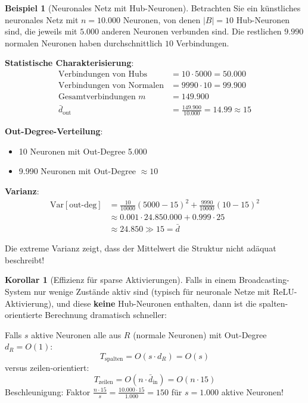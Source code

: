 \documentclass[a4paper,12pt]{report}
\theoremstyle{definition}
\newtheorem{beispiel}{Beispiel}
\newtheorem{korollar}{Korollar}
\begin{document}
	\begin{beispiel}[Neuronales Netz mit Hub-Neuronen]
		Betrachten Sie ein künstliches neuronales Netz mit $n = 10.000$ Neuronen, von denen $|B| = 10$ Hub-Neuronen sind, die jeweils mit $5.000$ anderen Neuronen verbunden sind. Die restlichen $9.990$ normalen Neuronen haben durchschnittlich $10$ Verbindungen.
		
		\textbf{Statistische Charakterisierung}:
		\begin{align}
			\text{Verbindungen von Hubs} &= 10 \cdot 5000 = 50.000 \\
			\text{Verbindungen von Normalen} &= 9990 \cdot 10 = 99.900 \\
			\text{Gesamtverbindungen } m &= 149.900 \\
			\bar{d}_{\text{out}} &= \frac{149.900}{10.000} = 14.99 \approx 15
		\end{align}
		
		\textbf{Out-Degree-Verteilung}:
		\begin{itemize}
			\item 10 Neuronen mit Out-Degree 5.000
			\item 9.990 Neuronen mit Out-Degree $\approx 10$
		\end{itemize}
		
		\textbf{Varianz}:
		\begin{align}
			\text{Var}[\text{out-deg}] &= \frac{10}{10000}(5000 - 15)^2 + \frac{9990}{10000}(10 - 15)^2 \\
			&\approx 0.001 \cdot 24.850.000 + 0.999 \cdot 25 \\
			&\approx 24.850 \gg 15 = \bar{d}
		\end{align}
		
		Die extreme Varianz zeigt, dass der Mittelwert die Struktur nicht adäquat beschreibt!
	\end{beispiel}
	
	\begin{korollar}[Effizienz für sparse Aktivierungen]
		Falls in einem Broadcasting-System nur wenige Zustände aktiv sind (typisch für neuronale Netze mit ReLU-Aktivierung), und diese \textbf{keine} Hub-Neuronen enthalten, dann ist die spalten-orientierte Berechnung dramatisch schneller:
		
		Falls $s$ aktive Neuronen alle aus $R$ (normale Neuronen) mit Out-Degree $d_R = O(1)$:
		\[
		T_{\text{spalten}} = O(s \cdot d_R) = O(s)
		\]
		versus zeilen-orientiert:
		\[
		T_{\text{zeilen}} = O(n \cdot \bar{d}_{\text{in}}) = O(n \cdot 15)
		\]
		Beschleunigung: Faktor $\frac{n \cdot 15}{s} = \frac{10.000 \cdot 15}{1.000} = 150$ für $s = 1.000$ aktive Neuronen!
	\end{korollar}
	
\end{document}
